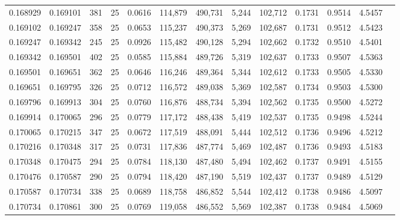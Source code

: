 \begin{tabular}{rrrrrrrrrrrrr}
0.168929 & 0.169101 &   381 &  25 &                                     0.0616 & 114,879 & 490,731 &   5,244 & 102,712 & 0.1731 & 0.9514 & 4.5457 \\
0.169102 & 0.169247 &   358 &  25 &                                     0.0653 & 115,237 & 490,373 &   5,269 & 102,687 & 0.1731 & 0.9512 & 4.5423 \\
0.169247 & 0.169342 &   245 &  25 &                                     0.0926 & 115,482 & 490,128 &   5,294 & 102,662 & 0.1732 & 0.9510 & 4.5401 \\
0.169342 & 0.169501 &   402 &  25 &                                     0.0585 & 115,884 & 489,726 &   5,319 & 102,637 & 0.1733 & 0.9507 & 4.5363 \\
0.169501 & 0.169651 &   362 &  25 &                                     0.0646 & 116,246 & 489,364 &   5,344 & 102,612 & 0.1733 & 0.9505 & 4.5330 \\
0.169651 & 0.169795 &   326 &  25 &                                     0.0712 & 116,572 & 489,038 &   5,369 & 102,587 & 0.1734 & 0.9503 & 4.5300 \\
0.169796 & 0.169913 &   304 &  25 &                                     0.0760 & 116,876 & 488,734 &   5,394 & 102,562 & 0.1735 & 0.9500 & 4.5272 \\
0.169914 & 0.170065 &   296 &  25 &                                     0.0779 & 117,172 & 488,438 &   5,419 & 102,537 & 0.1735 & 0.9498 & 4.5244 \\
0.170065 & 0.170215 &   347 &  25 &                                     0.0672 & 117,519 & 488,091 &   5,444 & 102,512 & 0.1736 & 0.9496 & 4.5212 \\
0.170216 & 0.170348 &   317 &  25 &                                     0.0731 & 117,836 & 487,774 &   5,469 & 102,487 & 0.1736 & 0.9493 & 4.5183 \\
0.170348 & 0.170475 &   294 &  25 &                                     0.0784 & 118,130 & 487,480 &   5,494 & 102,462 & 0.1737 & 0.9491 & 4.5155 \\
0.170476 & 0.170587 &   290 &  25 &                                     0.0794 & 118,420 & 487,190 &   5,519 & 102,437 & 0.1737 & 0.9489 & 4.5129 \\
0.170587 & 0.170734 &   338 &  25 &                                     0.0689 & 118,758 & 486,852 &   5,544 & 102,412 & 0.1738 & 0.9486 & 4.5097 \\
0.170734 & 0.170861 &   300 &  25 &                                     0.0769 & 119,058 & 486,552 &   5,569 & 102,387 & 0.1738 & 0.9484 & 4.5069 \\

\end{tabular}
